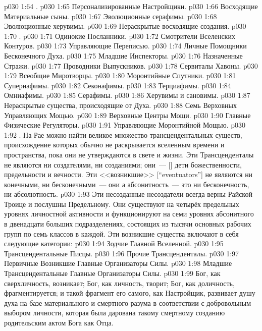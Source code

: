 \vs p030 1:64 .
\vs p030 1:65 Персонализированные Настройщики.
\vs p030 1:66 Восходящие Материальные сыны.
\vs p030 1:67 Эволюционные серафимы.
\vs p030 1:68 Эволюционные херувимы.
\vs p030 1:69 Нераскрытые восходящие создания.
\vs p030 1:70 .
\vs p030 1:71 Одинокие Посланники.
\vs p030 1:72 Смотрители Вселенских Контуров.
\vs p030 1:73 Управляющие Переписью.
\vs p030 1:74 Личные Помощники Бесконечного Духа.
\vs p030 1:75 Младшие Инспекторы.
\vs p030 1:76 Назначенные Стражи.
\vs p030 1:77 Проводники Выпускников.
\vs p030 1:78 Сервиталы Хавоны.
\vs p030 1:79 Всеобщие Миротворцы.
\vs p030 1:80 Моронтийные Спутники.
\vs p030 1:81 Супернафимы.
\vs p030 1:82 Секонафимы.
\vs p030 1:83 Терциафимы.
\vs p030 1:84 Омниафимы.
\vs p030 1:85 Серафимы.
\vs p030 1:86 Херувимы и сановимы.
\vs p030 1:87 Нераскрытые существа, происходящие от Духа.
\vs p030 1:88 Семь Верховных Управляющих Мощью.
\vs p030 1:89 Верховные Центры Мощи.
\vs p030 1:90 Главные Физические Регуляторы.
\vs p030 1:91 Управляющие Моронтийной Мощью.
\vs p030 1:92 . На Рае можно найти великое множество трансцендентальных существ, происхождение которых обычно не раскрывается вселенным времени и пространства, пока они не утверждаются в свете и жизни. Эти Трансценденталы не являются ни создателями, ни созданиями; они~---  [] дети божественности, предельности и вечности. Эти <<возникшие>> [``eventuators''] не являются ни конечными, ни бесконечными~--- они  а абсонитность~--- это ни бесконечность, ни абсолютность.
\vs p030 1:93 Эти несозданные несоздатели всегда верны Райской Троице и послушны Предельному. Они существуют на четырёх предельных уровнях личностной активности и функционируют на семи уровнях абсонитного в двенадцати больших подразделениях, состоящих из тысячи основных рабочих групп по семь классов в каждой. Эти возникшие существа включают в себя следующие категории:
\vs p030 1:94 Зодчие Главной Вселенной.
\vs p030 1:95 Трансцендентальные Писцы.
\vs p030 1:96 Прочие Трансценденталы.
\vs p030 1:97 Первичные Возникшие Главные Организаторы Силы.
\vs p030 1:98 Младшие Трансцендентальные Главные Организаторы Силы.
\vs p030 1:99 \pc Бог, как сверхличность, возникает; Бог, как личность, творит; Бог, как доличность, фрагментируется; и такой фрагмент его самого, как Настройщик, развивает душу духа на базе материального и смертного разума в соответствии с добровольным выбором личности, которая была дарована такому смертному созданию родительским актом Бога как Отца.
